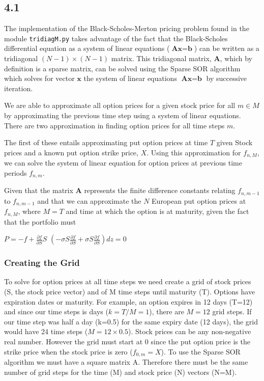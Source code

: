 \documentclass[paper=a4, fontsize=10pt]{article} %
\begin{document}
{{    }

}

\subsection{4.1}

The implementation of the Black-Scholes-Merton pricing problem found in the module \texttt{tridiagM.py} takes advantage of the fact that the Black-Scholes differential equation as a system of linear equations ($\textbf{A}\textbf{x} = \textbf{b}$) can be written as a tridiagonal $(N-1)\times(N-1)$ matrix. This tridiagonal matrix, $\textbf{A}$, which by definition is a sparse matrix, can be solved using the Sparse SOR algorithm
 which solves for vector $\textbf{x}$ the system of linear equations $\textbf{A}\textbf{x} = \textbf{b}$ by successive iteration. 

We are able to approximate all option prices for a given stock price for all $m \in M$ by approximating the previous time step using a system of linear equations. There are two approximation in finding option prices for all time steps $m$. 

The first of these entails approximating put option prices at time $T$ given Stock prices and a known put option strike price, $X$. Using this approximation for $f_{n,M}$, we can solve the system of linear equation for option prices at previous time periods $f_{n,m}$.

Given that the matrix $\textbf{A}$ represents the finite difference constants relating $f_{n, m-1}$ to $f_{n, m-1}$ and that we can approximate the $N$ European put option prices at $f_{n,M}$, where $M=T$ and time at which the option is at maturity, given the fact that the portfolio must 

$P = -f + \frac{\partial{f}}{\partial{S}}S$
$\left( -\sigma S \frac{\partial{f}}{\partial{S}} +\sigma S \frac{\partial{f}}{\partial{S}} \right) dz = 0 $

 
\subsubsection{Creating the Grid}
To solve for option prices at all time steps we need create a grid of stock prices (S, the stock price vector) and of M time steps until maturity (T).
Options have expiration dates or maturity. For example, an option expires in 12 days (T=12) and since our time steps is days ($k=T/M=1$), there are $M=12$ grid steps. If our time step was half a day (k=0.5) for the same expiry date (12 days), the grid would have 24 time steps ($M = 12 \times 0.5$).
Stock prices can be any non-negative real number. However the grid must start at 0 since the put option price is the strike price when the stock price is zero ($f_{0,m} = X$). To use the Sparse SOR algorithm we must have a square matrix A. Therefore there must be the same number of grid steps for the time (M) and stock price (N) vectors (N=M).
\end{document}
